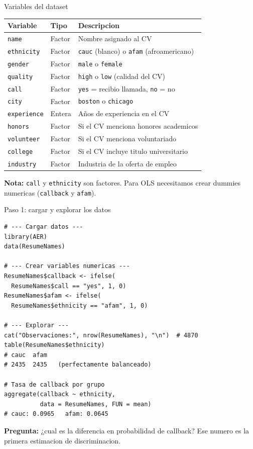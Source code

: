 \documentclass[aspectratio=169, 11pt]{beamer}
\begin{document}
\begin{frame}{Variables del dataset}
\small
\begin{center}
\footnotesize
\begin{tabular}{llp{7cm}}
\toprule
\textbf{Variable} & \textbf{Tipo} & \textbf{Descripcion} \\
\midrule
\texttt{name} & Factor & Nombre asignado al CV \\
\texttt{ethnicity} & Factor & \texttt{cauc} (blanco) o \texttt{afam} (afroamericano) \\
\texttt{gender} & Factor & \texttt{male} o \texttt{female} \\
\texttt{quality} & Factor & \texttt{high} o \texttt{low} (calidad del CV) \\
\texttt{call} & Factor & \texttt{yes} = recibio llamada, \texttt{no} = no \\
\texttt{city} & Factor & \texttt{boston} o \texttt{chicago} \\
\texttt{experience} & Entera & A\~nos de experiencia en el CV \\
\texttt{honors} & Factor & Si el CV menciona honores academicos \\
\texttt{volunteer} & Factor & Si el CV menciona voluntariado \\
\texttt{college} & Factor & Si el CV incluye titulo universitario \\
\texttt{industry} & Factor & Industria de la oferta de empleo \\
\bottomrule
\end{tabular}
\end{center}

\vspace{0.2cm}
\small \textbf{Nota:} \texttt{call} y \texttt{ethnicity} son factores. Para OLS necesitamos crear dummies numericas (\texttt{callback} y \texttt{afam}).
\end{frame}

\begin{frame}[fragile]{Paso 1: cargar y explorar los datos}
\begin{lstlisting}[basicstyle=\ttfamily\scriptsize]
# --- Cargar datos ---
library(AER)
data(ResumeNames)

# --- Crear variables numericas ---
ResumeNames$callback <- ifelse(
  ResumeNames$call == "yes", 1, 0)
ResumeNames$afam <- ifelse(
  ResumeNames$ethnicity == "afam", 1, 0)

# --- Explorar ---
cat("Observaciones:", nrow(ResumeNames), "\n")  # 4870
table(ResumeNames$ethnicity)
# cauc  afam
# 2435  2435   (perfectamente balanceado)

# Tasa de callback por grupo
aggregate(callback ~ ethnicity,
          data = ResumeNames, FUN = mean)
# cauc: 0.0965   afam: 0.0645
\end{lstlisting}

\vspace{0.1cm}
\small \textbf{Pregunta:} ¿cual es la diferencia en probabilidad de callback? Ese numero es la primera estimacion de discriminacion.
\end{frame}
\end{document}

